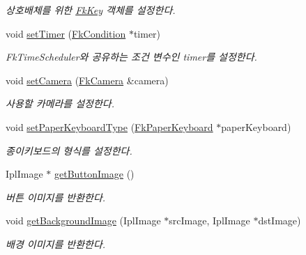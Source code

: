 \begin{DoxyCompactItemize}
\begin{DoxyCompactList}\small\item\em 상호배체를 위한 \hyperlink{class_fk_key}{Fk\+Key} 객체를 설정한다. \end{DoxyCompactList}\item 
\hypertarget{class_fk_main_worker_a85ae4c7f7125a9d769d9de1ea45136ee}{}void \hyperlink{class_fk_main_worker_a85ae4c7f7125a9d769d9de1ea45136ee}{set\+Timer} (\hyperlink{class_fk_condition}{Fk\+Condition} $\ast$timer)\label{class_fk_main_worker_a85ae4c7f7125a9d769d9de1ea45136ee}

\begin{DoxyCompactList}\small\item\em Fk\+Time\+Scheduler와 공유하는 조건 변수인 timer를 설정한다. \end{DoxyCompactList}\item 
\hypertarget{class_fk_main_worker_aee61ef593ca1dbcaf2bbc227ce0bccd9}{}void \hyperlink{class_fk_main_worker_aee61ef593ca1dbcaf2bbc227ce0bccd9}{set\+Camera} (\hyperlink{class_fk_camera}{Fk\+Camera} \&camera)\label{class_fk_main_worker_aee61ef593ca1dbcaf2bbc227ce0bccd9}

\begin{DoxyCompactList}\small\item\em 사용할 카메라를 설정한다. \end{DoxyCompactList}\item 
\hypertarget{class_fk_main_worker_ae9b375436b377fb10972601e033e5ea1}{}void \hyperlink{class_fk_main_worker_ae9b375436b377fb10972601e033e5ea1}{set\+Paper\+Keyboard\+Type} (\hyperlink{class_fk_paper_keyboard}{Fk\+Paper\+Keyboard} $\ast$paper\+Keyboard)\label{class_fk_main_worker_ae9b375436b377fb10972601e033e5ea1}

\begin{DoxyCompactList}\small\item\em 종이키보드의 형식를 설정한다. \end{DoxyCompactList}\item 
\hypertarget{class_fk_main_worker_afc6bd8c0a131ba500fa35a582fc6a780}{}Ipl\+Image $\ast$ \hyperlink{class_fk_main_worker_afc6bd8c0a131ba500fa35a582fc6a780}{get\+Button\+Image} ()\label{class_fk_main_worker_afc6bd8c0a131ba500fa35a582fc6a780}

\begin{DoxyCompactList}\small\item\em 버튼 이미지를 반환한다. \end{DoxyCompactList}\item 
\hypertarget{class_fk_main_worker_a73aa3fb73d74c684aa9bfd6e7d29b85d}{}void \hyperlink{class_fk_main_worker_a73aa3fb73d74c684aa9bfd6e7d29b85d}{get\+Background\+Image} (Ipl\+Image $\ast$src\+Image, Ipl\+Image $\ast$dst\+Image)\label{class_fk_main_worker_a73aa3fb73d74c684aa9bfd6e7d29b85d}

\begin{DoxyCompactList}\small\item\em 배경 이미지를 반환한다. \end{DoxyCompactList}\end{DoxyCompactItemize}
